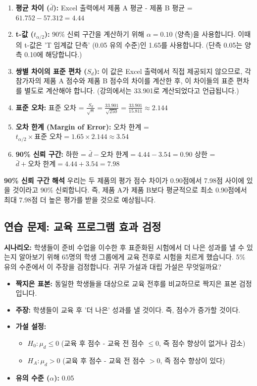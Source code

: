 \documentclass[11pt,a4paper]{article}
\begin{document}
\begin{enumerate}
    \item \textbf{평균 차이 ($\bar{d}$):}
    Excel 출력에서 제품 A 평균 - 제품 B 평균 = $61.752 - 57.312 = 4.44$
    \item \textbf{t-값 ($t_{\alpha/2}$):}
    90\% 신뢰 구간을 계산하기 위해 $\alpha = 0.10$ (양측)을 사용합니다. 이때의 t-값은 'T 임계값 단측' (0.05 유의 수준)인 1.65를 사용합니다. (단측 0.05는 양측 0.10에 해당합니다.)
    \item \textbf{쌍별 차이의 표준 편차 ($S_d$):}
    이 값은 Excel 출력에서 직접 제공되지 않으므로, 각 참가자의 제품 A 점수와 제품 B 점수의 차이를 계산한 후, 이 차이들의 표준 편차를 별도로 계산해야 합니다. (강의에서는 33.901로 계산되었다고 언급됩니다.)
    \item \textbf{표준 오차:}
    표준 오차 = $\frac{S_d}{\sqrt{n}} = \frac{33.901}{\sqrt{250}} = \frac{33.901}{15.811} \approx 2.144$
    \item \textbf{오차 한계 (Margin of Error):}
    오차 한계 = $t_{\alpha/2} \times \text{표준 오차} = 1.65 \times 2.144 \approx 3.54$
    \item \textbf{90\% 신뢰 구간:}
    하한 = $\bar{d} - \text{오차 한계} = 4.44 - 3.54 = 0.90$
    상한 = $\bar{d} + \text{오차 한계} = 4.44 + 3.54 = 7.98$
\end{enumerate}

\begin{summarybox}
\textbf{90\% 신뢰 구간 해석}
우리는 두 제품의 평가 점수 차이가 0.90점에서 7.98점 사이에 있을 것이라고 90\% 신뢰합니다. 즉, 제품 A가 제품 B보다 평균적으로 최소 0.90점에서 최대 7.98점 더 높은 평가를 받을 것으로 예상됩니다.
\end{summarybox}

\subsection*{연습 문제: 교육 프로그램 효과 검정}
\begin{examplebox}
\textbf{시나리오:}
학생들이 준비 수업을 이수한 후 표준화된 시험에서 더 나은 성과를 낼 수 있는지 알아보기 위해 65명의 학생 그룹에게 교육 전후로 시험을 치르게 했습니다. 5\% 유의 수준에서 이 주장을 검정합니다. 귀무 가설과 대립 가설은 무엇일까요?
\end{examplebox}

\begin{itemize}
    \item \textbf{짝지은 표본:} 동일한 학생들을 대상으로 교육 전후를 비교하므로 짝지은 표본 검정입니다.
    \item \textbf{주장:} 학생들이 교육 후 '더 나은' 성과를 낼 것이다. 즉, 점수가 증가할 것이다.
    \item \textbf{가설 설정:}
    \begin{itemize}
        \item $H_0: \mu_d \le 0$ (교육 후 점수 - 교육 전 점수 $\le 0$, 즉 점수 향상이 없거나 감소)
        \item $H_A: \mu_d > 0$ (교육 후 점수 - 교육 전 점수 $> 0$, 즉 점수 향상이 있다)
    \end{itemize}
    \item \textbf{유의 수준 ($\alpha$):} 0.05
\end{itemize}
\end{document}
